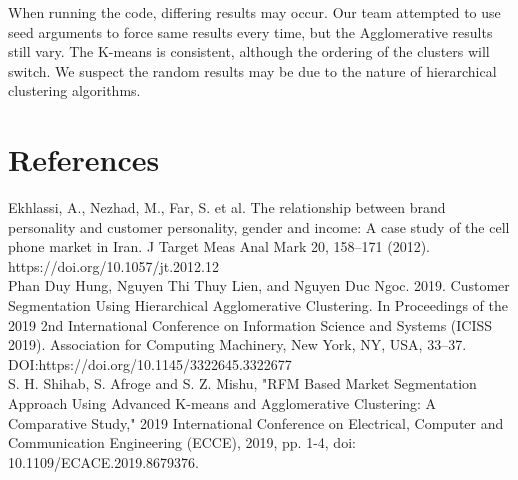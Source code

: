 \documentclass[12pt]{article}
\begin{document}
\noindent When running the code, differing results may occur. Our team attempted to use seed arguments to force same results every time, but the Agglomerative results still vary. The K-means is consistent, although the ordering of the clusters will switch. We suspect the random results may be due to the nature of hierarchical clustering algorithms.

\section{References}
Ekhlassi, A., Nezhad, M., Far, S. et al. The relationship between brand personality and customer personality, gender and income: A case study of the cell phone market in Iran. J Target Meas Anal Mark 20, 158–171 (2012). https://doi.org/10.1057/jt.2012.12 \\

\noindent Phan Duy Hung, Nguyen Thi Thuy Lien, and Nguyen Duc Ngoc. 2019. Customer Segmentation Using Hierarchical Agglomerative Clustering. In Proceedings of the 2019 2nd International Conference on Information Science and Systems (ICISS 2019). Association for Computing Machinery, New York, NY, USA, 33–37. DOI:https://doi.org/10.1145/3322645.3322677 \\

\noindent S. H. Shihab, S. Afroge and S. Z. Mishu, "RFM Based Market Segmentation Approach Using Advanced K-means and Agglomerative Clustering: A Comparative Study," 2019 International Conference on Electrical, Computer and Communication Engineering (ECCE), 2019, pp. 1-4, doi: 10.1109/ECACE.2019.8679376.
\end{document}
